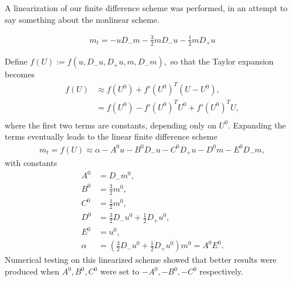 A linearization of our finite difference scheme was performed, in an attempt to say something about the nonlinear scheme. 

\begin{align*}
m_{t} = -uD_{-}m - \frac{3}{2}mD_{-}u - \frac{1}{2}mD_{+}u
\end{align*} 

Define $f(U) := f(u, D_{-}u, D_{+}u, m, D_{-}m),$ so that the Taylor expansion becomes
\begin{align*}
f(U) &\approx f(U^{0}) + f'(U^{0})^{T}(U-U^{0}),\\
&= f(U^{0}) - f'(U^{0})^{T}U^{0} + f'(U^{0})^{T}U, \\
\end{align*}
where the first two terms are constants, depending only on  $U^{0}$. Expanding the terms eventually leads to the linear finite difference scheme
\begin{align*}
m_{t} = f(U) \approx \alpha - A^{0}u - B^{0}D_{-}u - C^{0}D_{+}u - D^{0}m - E^{0}D_{-}m,
\end{align*}
with constants
\begin{align*}
A^{0} &= D_{-}m^{0}, \\
B^{0} &= \frac{3}{2}m^{0}, \\
C^{0} &= \frac{1}{2}m^{0}, \\
D^{0} &= \frac{3}{2}D_{-}u^{0} + \frac{1}{2}D_{+}u^{0}, \\
E^{0} &= u^{0}, \\
\alpha &= (\frac{3}{2}D_{-}u^{0} + \frac{1}{2}D_{+}u^{0})m^{0} = A^{0}E^{0}.
\end{align*}
Numerical testing on this linearized scheme showed that better results were produced when $A^{0}, B^{0}, C^{0}$ were set to $-A^{0}, -B^{0}, -C^{0}$ respectively. 